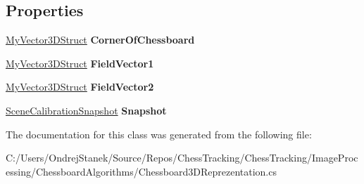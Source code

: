 \subsection*{Properties}
\begin{DoxyCompactItemize}
\item 
\mbox{\label{class_chess_tracking_1_1_image_processing_1_1_chessboard_algorithms_1_1_chessboard3_d_reprezentation_a880c3b896d1feb823d83e6b05df9a084}} 
\mbox{\hyperlink{class_chess_tracking_1_1_utils_1_1_my_vector3_d_struct}{My\+Vector3\+D\+Struct}} {\bfseries Corner\+Of\+Chessboard}
\item 
\mbox{\label{class_chess_tracking_1_1_image_processing_1_1_chessboard_algorithms_1_1_chessboard3_d_reprezentation_a68df655f30e7fdc2bc99c984e446edff}} 
\mbox{\hyperlink{class_chess_tracking_1_1_utils_1_1_my_vector3_d_struct}{My\+Vector3\+D\+Struct}} {\bfseries Field\+Vector1}
\item 
\mbox{\label{class_chess_tracking_1_1_image_processing_1_1_chessboard_algorithms_1_1_chessboard3_d_reprezentation_ae9b65f5f108b013b1878e885bb49d4f7}} 
\mbox{\hyperlink{class_chess_tracking_1_1_utils_1_1_my_vector3_d_struct}{My\+Vector3\+D\+Struct}} {\bfseries Field\+Vector2}
\item 
\mbox{\label{class_chess_tracking_1_1_image_processing_1_1_chessboard_algorithms_1_1_chessboard3_d_reprezentation_aa9d91b1d88393f12e64ebe635be76f7e}} 
\mbox{\hyperlink{class_chess_tracking_1_1_image_processing_1_1_pipeline_data_1_1_scene_calibration_snapshot}{Scene\+Calibration\+Snapshot}} {\bfseries Snapshot}
\end{DoxyCompactItemize}


The documentation for this class was generated from the following file\+:\begin{DoxyCompactItemize}
\item 
C\+:/\+Users/\+Ondrej\+Stanek/\+Source/\+Repos/\+Chess\+Tracking/\+Chess\+Tracking/\+Image\+Processing/\+Chessboard\+Algorithms/Chessboard3\+D\+Reprezentation.\+cs\end{DoxyCompactItemize}
